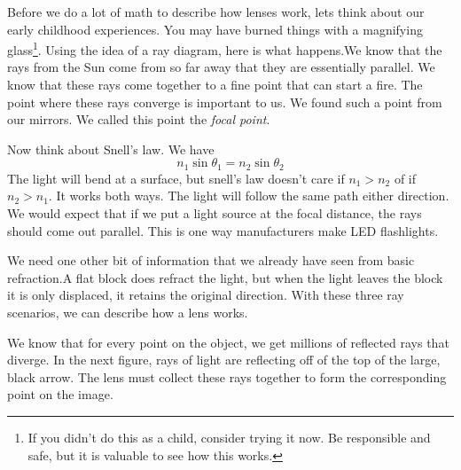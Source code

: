 \documentclass{article}
\begin{document}
Before we do a lot of math to describe how lenses work, lets think about our
early childhood experiences. You may have burned things with a magnifying
glass\footnote{%
If you didn't do this as a child, consider trying it now. Be responsible and
safe, but it is valuable to see how this works.}. Using the idea of a ray
diagram, here is what happens.We know that the rays from the
Sun come from so far away that they are essentially parallel. We know that
these rays come together to a fine point that can start a fire. The point
where these rays converge is important to us. We found such a point from our
mirrors. We called this point the \emph{focal point}.

Now think about Snell's law. We have 
\[
n_{1}\sin \theta _{1}=n_{2}\sin \theta _{2}
\]%
The light will bend at a surface, but snell's law doesn't care if $%
n_{1}>n_{2}$ of if $n_{2}>n_{1}.$ It works both ways. The light will follow
the same path either direction. We would expect that if we put a light
source at the focal distance, the rays should come out parallel. %
This is one way manufacturers make LED flashlights.

We need one other bit of information that we already have seen from basic
refraction.A flat block does refract the
light, but when the light leaves the block it is only displaced, it retains
the original direction. With these three ray scenarios, we can describe how
a lens works.

We know that for every point on the object, we get millions of reflected
rays that diverge. In the next figure, rays of light are reflecting off of
the top of the large, black arrow. The lens must collect these rays together
to form the corresponding point on the image.
\end{document}
